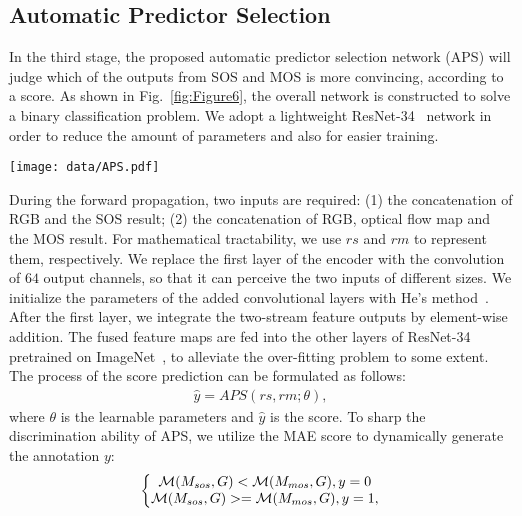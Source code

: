 \documentclass[sigconf]{acmart}
\begin{document}
\subsection{Automatic Predictor Selection}
In the third stage, the proposed automatic predictor selection network (APS) will judge which of the outputs from SOS and MOS is more convincing, according to a score. As shown in Fig.~\ref{fig:Figure6}, the overall network is constructed to solve a binary classification problem. We adopt a lightweight ResNet-34~\cite{Resnet} network in order to reduce the amount of parameters and also for easier training.
\begin{figure*}
\texttt{[image: data/APS.pdf]}\\
        \centering
        \caption{The overall architecture of the automatic predictor selection network.}
\label{fig:Figure6}
\end{figure*} 
During the forward propagation, two inputs are required: (1) the concatenation of RGB and the SOS result; (2) the concatenation of RGB, optical flow map and the MOS result. For mathematical tractability, we use $rs$ and $rm$ to represent them, respectively. We replace the first layer of the encoder with the convolution of $64$ output channels, so that it can perceive the two inputs of different sizes. 
We initialize the parameters of the added convolutional layers with He's method~\cite{PRelu}.
After the first layer, we integrate the two-stream feature outputs by element-wise addition. The fused feature maps are fed into the other layers of ResNet-34 pretrained on ImageNet~\cite{ImageNet}, to alleviate the over-fitting problem to some extent. 
The process of the score prediction can be formulated as follows:
	\begin{equation}\label{equ:5}
	\begin{split}
	\hat y = APS(rs, rm;\theta),
	\end{split} 
	\end{equation}
where $\theta$ is the learnable parameters and $\hat y$ is the score. To sharp the discrimination ability of APS, we utilize the MAE score to dynamically generate the annotation $y$:
\begin{equation}\label{equ:6}
\centering
    \left\{\begin{matrix}
    \mathcal{M}(M_{sos}, G) < \mathcal{M}(M_{mos},G),  y = 0\\
    \mathcal{M}(M_{sos}, G) >= \mathcal{M}(M_{mos},G), y = 1,
    \end{matrix}\right.
\end{equation}
\end{document}

